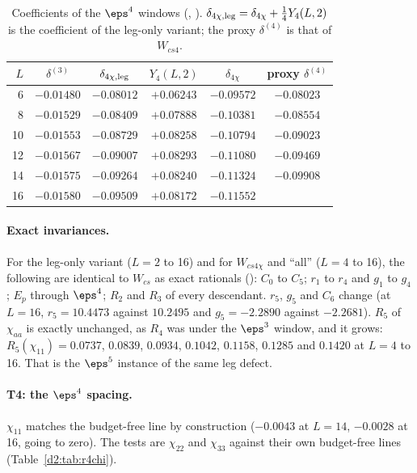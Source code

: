 \begin{table}[ht]
\centering\footnotesize\renewcommand{\arraystretch}{1.15}
\begin{tabular}{@{}rccccc@{}}
\toprule
$L$ & $\delta^{(3)}$ & $\delta_{4\chi,{\rm leg}}$ & $Y_4(L,2)$ & $\delta_{4\chi}$ & proxy $\delta^{(4)}$ \\\midrule
6 & $-0.01480$ & $-0.08012$ & $+0.06243$ & $-0.09572$ & $-0.08023$ \\
8 & $-0.01529$ & $-0.08409$ & $+0.07888$ & $-0.10381$ & $-0.08554$ \\
10 & $-0.01553$ & $-0.08729$ & $+0.08258$ & $-0.10794$ & $-0.09023$ \\
12 & $-0.01567$ & $-0.09007$ & $+0.08293$ & $-0.11080$ & $-0.09469$ \\
14 & $-0.01575$ & $-0.09264$ & $+0.08240$ & $-0.11324$ & $-0.09908$ \\
16 & $-0.01580$ & $-0.09509$ & $+0.08172$ & $-0.11552$ & \\
\bottomrule
\end{tabular}
\caption{Coefficients of the $\eps^4$ windows (, ).
$\delta_{4\chi,{\rm leg}}=\delta_{4\chi}+\frac14Y_4(L,2)$ is the coefficient of the leg-only variant; the proxy $\delta^{(4)}$ is that of
$W_{cs4}$.}
\label{d2:tab:d4chi}
\end{table}

\paragraph{Exact invariances.} For the leg-only variant ($L=2$ to 16) and for $W_{cs4\chi}$ and ``all'' ($L=4$ to 16), the following are
identical to $W_{cs}$ as exact rationals (): $C_0$ to $C_5$; $r_1$ to $r_4$ and $g_1$ to $g_4$; $E_p$
through $\eps^4$; $R_2$ and $R_3$ of every descendant. $r_5$, $g_5$ and $C_6$ change (at $L=16$, $r_5=10.4473$ against
$10.2495$ and $g_5=-2.2890$ against $-2.2681$). $R_5$ of $\chi_{aa}$ is exactly unchanged, as $R_4$ was under the $\eps^3$
window, and it grows: $R_5(\chi_{11})=0.0737$, $0.0839$, $0.0934$, $0.1042$, $0.1158$, $0.1285$ and $0.1420$ at $L=4$ to 16.
That is the $\eps^5$ instance of the same leg defect.

\paragraph{T4: the $\eps^4$ spacing.} $\chi_{11}$ matches the budget-free line by construction ($-0.0043$ at $L=14$, $-0.0028$ at
16, going to zero). The tests are $\chi_{22}$ and $\chi_{33}$ against their own budget-free lines (Table~\ref{d2:tab:r4chi}).

